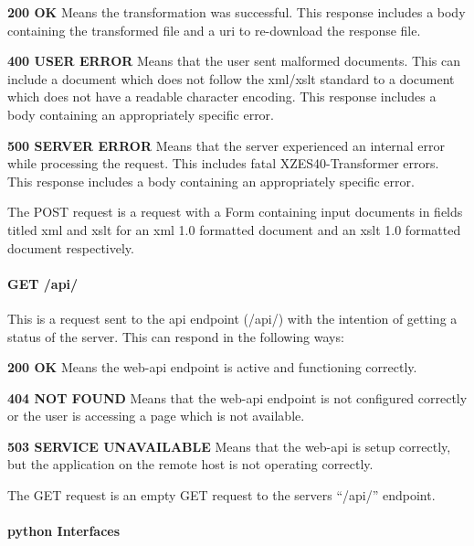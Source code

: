 \begin{description}
  \item {
      \textbf{200 OK}  Means the transformation was successful.
        This response includes a body containing the transformed file and a \gls{uri} to re-download the response file.
    }
    \item {
      \textbf{400 USER ERROR} Means that the user sent malformed documents.
        This can include a document which does not follow the \gls{xml}/\gls{xslt} standard to a document which does not have a readable character encoding.
        This response includes a body containing an appropriately specific error.
    }
    \item {
      \textbf{500 SERVER ERROR} Means that the server experienced an internal error while processing the request.
         This includes fatal XZES40-Transformer errors.
        This response includes a body containing an appropriately specific error.
    }
\end{description}

The POST request is a request with a Form containing input documents in fields titled \gls{xml} and \gls{xslt} for an \gls{xml} 1.0 formatted document and an \gls{xslt} 1.0 formatted document respectively.

\paragraph{GET /api/}

This is a request sent to the \gls{api} endpoint (/api/) with the intention of getting a status of the server. This can respond in the following ways:

\begin{description}
  \item \textbf{200 OK} Means the \gls{web-api} endpoint is active and functioning correctly.
    \item \textbf{404 NOT FOUND} Means that the \gls{web-api} endpoint is not configured correctly or the user is accessing a page which is not available.
    \item \textbf{503 SERVICE UNAVAILABLE} Means that the \gls{web-api} is setup correctly, but the application on the remote host is not operating correctly.
\end{description}

The GET request is an empty GET request to the servers ``/api/'' endpoint.

\paragraph{\gls{python} Interfaces}

